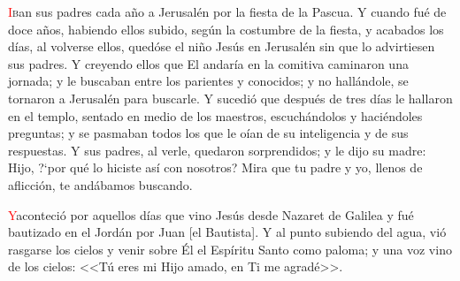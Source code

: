 \documentclass[10pt,twoside]{book}
\begin{document}
\vspace{0.5em}



\vspace{1.5em}

\noindent{}
\lettrine[lines=2]{\textcolor{red}{I}}ban sus padres cada año a Jerusalén por la fiesta de la Pascua. Y cuando fué de doce años, habiendo ellos subido, según la costumbre de la fiesta,
y acabados los días, al volverse ellos, quedóse el niño Jesús en Jerusalén sin que lo advirtiesen sus padres. Y creyendo ellos que El andaría en la comitiva caminaron una jornada; y le
buscaban entre los parientes y conocidos; y no hallándole, se tornaron a Jerusalén para buscarle. Y sucedió que después de tres días le hallaron en el templo,
sentado en medio de los maestros, escuchándolos y haciéndoles preguntas; y se pasmaban todos los que le oían de su inteligencia y de sus respuestas.
Y sus padres, al verle, quedaron sorprendidos; y le dijo su madre: Hijo, {?`}por qué lo hiciste así con nosotros? Mira que tu padre y yo, llenos de aflicción, 
te andábamos buscando.

\vspace{0.5em}

{}

\vspace{0.5em}

\iralfinal

\vspace{1.5em}

\noindent{}

\vspace{4mm}

\noindent{}
\lettrine[lines=2]{\textcolor{red}{Y}}\space aconteció por aquellos días que vino Jesús desde Nazaret de Galilea y fué bautizado en el Jordán por Juan [el Bautista].
Y al punto subiendo del agua, vió rasgarse los cielos y venir sobre Él el Espíritu Santo como paloma; y una voz vino de los cielos: 
<<Tú eres mi Hijo amado, en Ti me agradé>>.

\vspace{0.5em}
\end{document}
